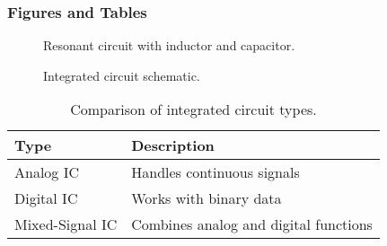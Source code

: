 \subsubsection*{Figures and Tables}
\begin{figure}[h!]
    \centering
    \caption{Resonant circuit with inductor and capacitor.}
    \label{fig:resonant-circuit}
\end{figure}

\begin{figure}[h!]
    \centering
    \caption{Integrated circuit schematic.}
    \label{fig:ic}
\end{figure}

\begin{table}[h!]
    \centering
    \begin{tabular}{|l|l|}
        \hline
        \textbf{Type} & \textbf{Description} \\
        \hline
        Analog IC & Handles continuous signals \\
        Digital IC & Works with binary data \\
        Mixed-Signal IC & Combines analog and digital functions \\
        \hline
    \end{tabular}
    \caption{Comparison of integrated circuit types.}
    \label{tab:ics}
\end{table}
